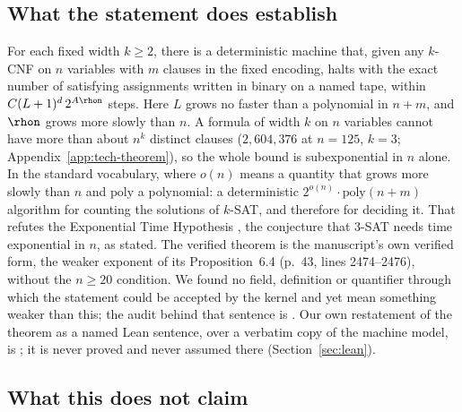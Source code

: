 \subsection{What the statement does establish}
\label{sec:statement-establishes}

For each fixed width $k \ge 2$, there is a deterministic machine that,
given any $k$-CNF on $n$ variables with $m$ clauses in the fixed
encoding, halts with the exact number of satisfying assignments written
in binary on a named tape, within $C(L+1)^d\,2^{A\rhon}$ steps. Here
$L$ grows no faster than a polynomial in $n + m$, and $\rhon$ grows more
slowly than $n$. A formula of width $k$ on $n$ variables cannot have
more than about $n^k$ distinct clauses ($2{,}604{,}376$ at $n = 125$,
$k = 3$; Appendix~\ref{app:tech-theorem}), so the whole bound is
subexponential in $n$ alone. In the standard vocabulary, where $o(n)$ means a quantity that grows more slowly than $n$ and $\mathrm{poly}$ a polynomial: a deterministic $2^{o(n)} \cdot \mathrm{poly}(n+m)$ algorithm for counting the solutions
of $k$-SAT, and therefore for deciding it. That refutes the Exponential
Time Hypothesis \citep{ImpagliazzoPaturi2001}, the conjecture that
3-SAT needs time exponential in $n$, as stated. The verified theorem is
the manuscript's own verified form, the weaker exponent of its
Proposition~6.4 (p.~43, lines 2474--2476), without the $n \ge 20$
condition. We found no field, definition or quantifier through which
the statement could be accepted by the kernel and yet mean something
weaker than this; the audit behind that sentence is
. Our own
restatement of the theorem as a named Lean sentence, over a verbatim
copy of the machine model, is ; it is never proved
and never assumed there (Section~\ref{sec:lean}).

\subsection{What this does not claim}
\label{sec:statement-not}

